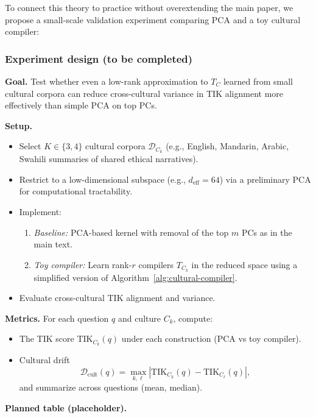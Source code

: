 \documentclass[11pt]{article}
\begin{document}
To connect this theory to practice without overextending the main paper, we propose a small-scale validation experiment comparing PCA and a toy cultural compiler:

\subsubsection{Experiment design (to be completed)}

\textbf{Goal.} Test whether even a low-rank approximation to \(T_C\) learned from small cultural corpora can reduce cross-cultural variance in TIK alignment more effectively than simple PCA on top PCs.

\textbf{Setup.}

\begin{itemize}
    \item Select \(K \in \{3, 4\}\) cultural corpora \(\mathcal{D}_{C_k}\) (e.g., English, Mandarin, Arabic, Swahili summaries of shared ethical narratives).
    \item Restrict to a low-dimensional subspace (e.g., \(d_{\text{eff}} = 64\)) via a preliminary PCA for computational tractability.
    \item Implement:
    \begin{enumerate}
        \item \emph{Baseline:} PCA-based kernel with removal of the top \(m\) PCs as in the main text.
        \item \emph{Toy compiler:} Learn rank-\(r\) compilers \(T_{C_k}\) in the reduced space using a simplified version of Algorithm~\ref{alg:cultural-compiler}.
    \end{enumerate}
    \item Evaluate cross-cultural TIK alignment and variance.
\end{itemize}

\textbf{Metrics.} For each question \(q\) and culture \(C_k\), compute:

\begin{itemize}
    \item The TIK score \(\mathrm{TIK}_{C_k}(q)\) under each construction (PCA vs toy compiler).
    \item Cultural drift
    \[
    \mathcal{D}_{\text{cult}}(q) = \max_{k, \ell} \left\lvert \mathrm{TIK}_{C_k}(q) - \mathrm{TIK}_{C_\ell}(q) \right\rvert,
    \]
    and summarize across questions (mean, median).
\end{itemize}

\textbf{Planned table (placeholder).}
\end{document}
